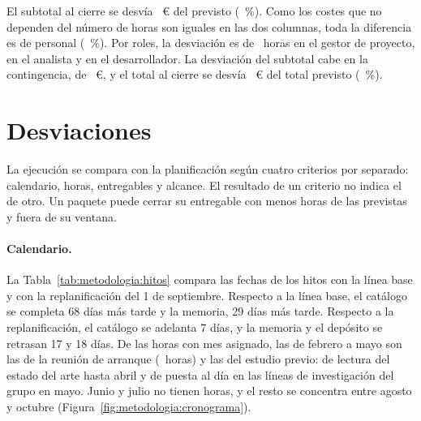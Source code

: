 El subtotal al cierre se desvía ~€ del previsto
(~\%). Como los costes que no dependen del número de horas
son iguales en las dos columnas, toda la diferencia es de personal
(~\%). Por roles, la desviación es de
~horas en el gestor de proyecto,
 en el analista y 
en el desarrollador. La desviación del subtotal cabe en la contingencia,
de ~€, y el total al cierre se desvía
~€ del total previsto
(~\%).

\section{Desviaciones}
\label{sec:metodologia:desviaciones}

La ejecución se compara con la planificación según cuatro criterios por
separado: calendario, horas, entregables y alcance. El resultado de un
criterio no indica el de otro. Un paquete puede cerrar su entregable con menos
horas de las previstas y fuera de su ventana.

\paragraph{Calendario.} La Tabla~\ref{tab:metodologia:hitos} compara
las fechas de los hitos con la línea base y con la replanificación del
1 de septiembre. Respecto a la línea base, el catálogo se completa 68
días más tarde y la memoria, 29 días más tarde. Respecto a la
replanificación, el catálogo se adelanta 7 días, y la memoria y el
depósito se retrasan 17 y 18 días. De las horas con mes asignado, las de febrero a mayo son las de la reunión de arranque
(~horas) y las del estudio previo:
 de lectura del estado del arte hasta abril
y  de puesta al día en las líneas de
investigación del grupo en mayo. Junio y julio no tienen horas, y el
resto se concentra entre agosto y octubre
(Figura~\ref{fig:metodologia:cronograma}).

